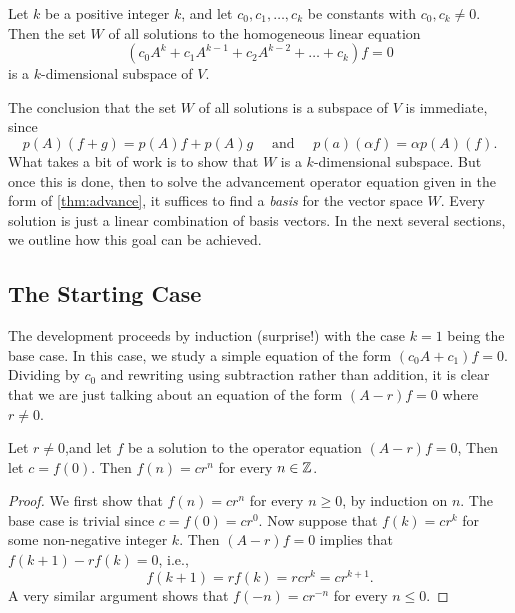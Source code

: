 \begin{theorem}\label{thm:advance}
Let $k$ be a positive integer $k$, and let $c_0,c_1,\dots,c_k$ be
constants with $c_0,c_k\neq 0$.  Then the set $W$ of all solutions to the
homogeneous linear equation
\begin{equation}
(c_0A^{k}+ c_1A^{k-1} + c_2A^{k-2} + \dots+c_k)f = 0
\end{equation} 
is a $k$-dimensional subspace of $V$.
\end{theorem}

The conclusion that the set $W$ of all solutions is a subspace
of $V$ is immediate, since
\[
p(A)(f+g)=p(A)f+p(A)g\quad\text{ and }\quad p(a)(\alpha f)=\alpha p(A)(f).
\]  
What takes a bit of work is to show that $W$ is a 
$k$-dimensional subspace.  But once this is done,
then to solve the advancement operator 
equation given in the form of \autoref{thm:advance}, it 
suffices to find a \textit{basis} for the vector space $W$.  
Every solution is just a linear combination of basis vectors.
In the next several sections, we outline
how this goal can be achieved.

\subsection{The Starting Case}\label{s:recurrence:rigorous:start}

The development proceeds by induction (surprise!) with
the case $k=1$ being the base case.  In this case, we study
a simple equation of the form $(c_0A+c_1)f=0$.  Dividing by
$c_0$ and rewriting using subtraction rather than addition, it
is clear that we are just talking about an equation of the form
$(A-r)f=0$ where $r\neq0$.

\begin{lemma}\label{lem:base}
Let $r\neq0$,and let $f$ be a solution to the operator equation $(A-r)f=0$,
Then let $c=f(0)$.  Then $f(n)=cr^n$ for every
$n\in \mathbb{Z}$.
\end{lemma}

\begin{proof}  We first show that $f(n)=cr^n$ for every
$n\ge0$, by induction on $n$.  The base case is trivial since
$c=f(0) = cr^0$.  Now suppose that $f(k)=cr^k$ for some non-negative
integer $k$.  Then $(A-r)f=0$ implies that $f(k+1)-rf(k)=0$, i.e.,
\[
f(k+1)=rf(k)= rcr^k=cr^{k+1}.
\]
A very similar argument shows that $f(-n) = cr^{-n}$ for
every $n\le0$.
\end{proof}


